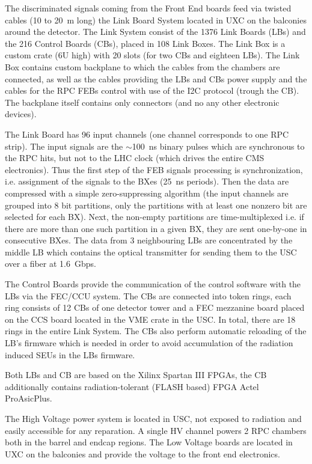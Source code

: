 	The discriminated signals coming from the Front End boards feed via twisted cables (10 to \SI{20}{m} long) the Link Board System located in UXC on the balconies around the detector. The Link System consist of the 1376 Link Boards (LBs) and the 216 Control Boards (CBs), placed in 108 Link Boxes. The Link Box is a custom crate (6U high) with 20 slots (for two CBs and eighteen LBs). The Link Box contains custom backplane to which the cables from the chambers are connected, as well as the cables providing the LBs and CBs power supply and the cables for the RPC FEBs control with use of the I2C protocol (trough the CB). The backplane itself contains only connectors (and no any other electronic devices).

	The Link Board has 96 input channels (one channel corresponds to one RPC strip). The input signals are the $\sim$\SI{100}{ns} binary pulses which are synchronous to the RPC hits, but not to the LHC clock (which drives the entire CMS electronics). Thus the first step of the FEB signals processing is synchronization, i.e. assignment of the signals to the BXes (\SI{25}{ns} periods). Then the data are compressed with a simple zero-suppressing algorithm (the input channels are grouped into 8 bit partitions, only the partitions with at least one nonzero bit are selected for each BX). Next, the non-empty partitions are time-multiplexed i.e. if there are more than one such partition in a given BX, they are sent one-by-one in consecutive BXes. The data from 3 neighbouring LBs are concentrated by the middle LB which contains the optical transmitter for sending them to the USC over a fiber 
at \SI{1.6}{Gbps}.

	The Control Boards provide the communication of the control software with the LBs via the FEC/CCU system. The CBs are connected into token rings, each ring consists of 12 CBs of one detector tower and a FEC mezzanine board placed on the CCS board located in the VME crate in the USC. In total, there are 18 rings in the entire Link System. The CBs also perform automatic reloading of the LB's firmware which is needed in order to avoid accumulation of the radiation induced SEUs in the LBs firmware. 

	Both LBs and CB are based on the Xilinx Spartan III FPGAs, the CB additionally contains radiation-tolerant (FLASH based) FPGA Actel ProAsicPlus.

	The High Voltage power system is located in USC, not exposed to radiation and easily accessible for any reparation. A single HV channel powers 2 RPC chambers both in the barrel and endcap regions. The Low Voltage boards are located in UXC on the balconies and provide the voltage to the front end electronics.

